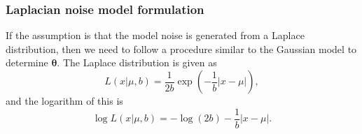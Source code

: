 \documentclass{article}
\begin{document}
\subsubsection{Laplacian noise model formulation}

If the assumption is that the model noise is generated from a Laplace distribution, then we need to follow a procedure similar to the Gaussian model to determine $\boldsymbol\theta$. The Laplace distribution is given as
\begin{equation}\label{eq:laplace}
L(x \vert \mu, b) = \frac{1}{2b} \exp\left(-\frac{1}{b}\vert x - \mu \vert \right),
\end{equation}
and the logarithm of this is
\begin{equation}\label{eq:log_laplace}
\log L(x \vert \mu, b) = -\log(2b) -\frac{1}{b}\vert x - \mu \vert.
\end{equation}
\end{document}
